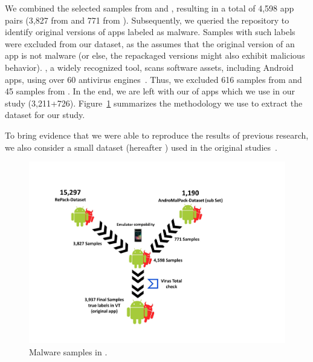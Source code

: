 
We combined the selected samples from \repack and \amc, resulting in a total of 4,598 app
pairs (3,827 from \repack and 771 from \amc). Subsequently, we queried the \vt repository
to identify original versions of apps labeled as malware. Samples with such labels were excluded from our dataset,
as the \mas assumes that the original version of an app is not malware (or else, the repackaged versions might
also exhibit malicious behavior). \vt, a widely recognized tool, scans software assets, including Android apps,
using over 60 antivirus engines~\cite{DBLP:journals/ese/KhanmohammadiEH19}. Thus, we excluded 616 samples from \repack and 45 samples from \amc. In the end, we are left with our \cds of \apps apps which we use in our study (3,211+726). Figure~\ref{fig:dataset} summarizes the methodology we use to extract the dataset for our study.

To bring evidence that we were able to reproduce the results of previous research, we also consider a small dataset (hereafter \sds)
used in the original studies~\cite{DBLP:conf/wcre/BaoLL18,DBLP:journals/jss/CostaMMSSBNR22}.


  \begin{figure}[htb]
   \includegraphics[width=\columnwidth]{images/dataSet_V2.pdf}
   \caption{Malware samples in \cds.}
   \label{fig:dataset}
 \end{figure}



